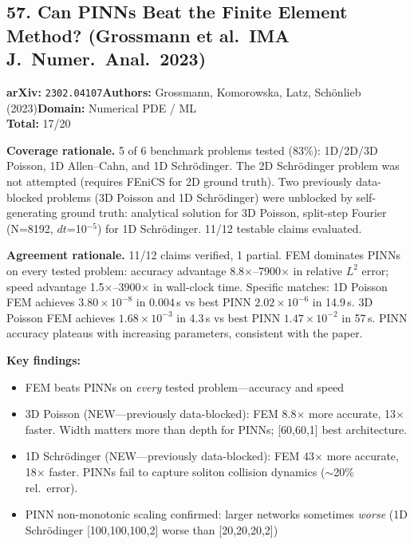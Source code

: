 \subsection{57. Can PINNs Beat the Finite Element Method? (Grossmann et al.\ IMA J.~Numer.~Anal.\ 2023)}
\textbf{arXiv:} \texttt{2302.04107}\quad\textbf{Authors:} Grossmann, Komorowska, Latz, Sch\"onlieb (2023)\quad\textbf{Domain:} Numerical PDE / ML\\
\quad{}\quad\textbf{Total:} 17/20\par\smallskip
\noindent\textbf{Coverage rationale.} 5 of 6 benchmark problems tested (83\%): 1D/2D/3D Poisson, 1D Allen--Cahn, and 1D Schr\"odinger. The 2D Schr\"odinger problem was not attempted (requires FEniCS for 2D ground truth). Two previously data-blocked problems (3D Poisson and 1D Schr\"odinger) were unblocked by self-generating ground truth: analytical solution for 3D Poisson, split-step Fourier (N=8192, $dt$=10$^{-5}$) for 1D Schr\"odinger. 11/12 testable claims evaluated.\par
\noindent\textbf{Agreement rationale.} 11/12 claims verified, 1 partial. FEM dominates PINNs on every tested problem: accuracy advantage 8.8$\times$--7900$\times$ in relative $L^2$ error; speed advantage 1.5$\times$--3900$\times$ in wall-clock time. Specific matches: 1D Poisson FEM achieves $3.80 \times 10^{-8}$ in 0.004\,s vs best PINN $2.02 \times 10^{-6}$ in 14.9\,s. 3D Poisson FEM achieves $1.68 \times 10^{-3}$ in 4.3\,s vs best PINN $1.47 \times 10^{-2}$ in 57\,s. PINN accuracy plateaus with increasing parameters, consistent with the paper.\par\smallskip
\noindent\textbf{Key findings:}
\begin{itemize}[leftmargin=1.4em,itemsep=0.2em,topsep=0.2em]
\item FEM beats PINNs on \emph{every} tested problem---accuracy and speed
\item 3D Poisson (NEW---previously data-blocked): FEM 8.8$\times$ more accurate, 13$\times$ faster. Width matters more than depth for PINNs; [60,60,1] best architecture.
\item 1D Schr\"odinger (NEW---previously data-blocked): FEM 43$\times$ more accurate, 18$\times$ faster. PINNs fail to capture soliton collision dynamics ($\sim$20\% rel.~error).
\item PINN non-monotonic scaling confirmed: larger networks sometimes \emph{worse} (1D Schr\"odinger [100,100,100,2] worse than [20,20,20,2])
\end{itemize}
